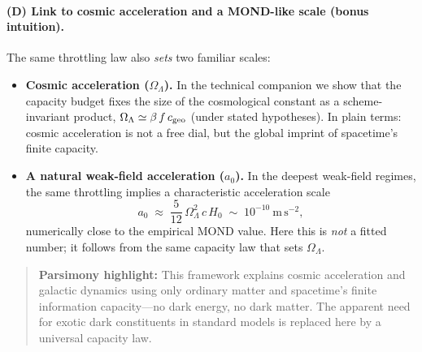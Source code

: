 \documentclass[aps,prd,onecolumn,superscriptaddress,nofootinbib]{revtex4-2}
\newcommand{\OmL}{\Omega_\Lambda}
\newcommand{\cgeo}{c_{\rm geo}}
\begin{document}
\medskip
\paragraph*{(D) Link to cosmic acceleration and a MOND-like scale (bonus intuition).}
The same throttling law also \emph{sets} two familiar scales:
\begin{itemize}
\item \textbf{Cosmic acceleration (\(\OmL\)).} In the technical companion we show that the capacity budget fixes the size of the cosmological constant as a scheme-invariant product, $\OmL \simeq \beta\,f\,\cgeo$ (under stated hypotheses). In plain terms: cosmic acceleration is not a free dial, but the global imprint of spacetime’s finite capacity.
\item \textbf{A natural weak-field acceleration (\(a_0\)).} In the deepest weak-field regimes, the same throttling implies a characteristic acceleration scale
\[
a_0 \;\approx\; \frac{5}{12}\,\OmL^2\,c\,H_0 \;\sim\; 10^{-10}\ \mathrm{m\,s^{-2}},
\]
numerically close to the empirical MOND value. Here this is \emph{not} a fitted number; it follows from the same capacity law that sets $\OmL$.
\end{itemize}

\begin{quote}
\textbf{Parsimony highlight:} This framework explains cosmic acceleration and galactic dynamics using only ordinary matter and spacetime's finite information capacity---no dark energy, no dark matter. The apparent need for exotic dark constituents in standard models is replaced here by a universal capacity law.
\end{quote}

\medskip
\end{document}
